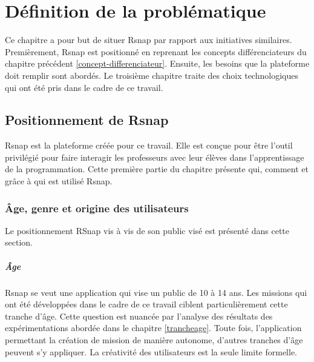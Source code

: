 \chapter{Définition de la problématique}
Ce chapitre a pour but de situer Rsnap par rapport aux initiatives similaires. Premièrement, Rsnap est positionné en reprenant les concepts différenciateurs du chapitre précédent \ref{concept-differenciateur}. Ensuite, les besoins que la plateforme doit remplir sont abordés. Le troisième chapitre traite des choix technologiques qui ont été pris dans le cadre de ce travail.

\section{Positionnement de Rsnap}
Rsnap est la plateforme créée pour ce travail. Elle est conçue pour être l'outil privilégié pour faire interagir les professeurs avec leur élèves dans l'apprentissage de la programmation.
Cette première partie du chapitre présente qui, comment et grâce à qui est utilisé Rsnap.

% 

\subsection{Âge, genre et origine des utilisateurs}
Le positionnement RSnap vis à vis de son public visé est présenté dans cette section.

\paragraph{Âge}
Rsnap se veut une application qui vise un public de 10 à 14 ans. Les missions qui ont été développées dans le cadre de ce travail ciblent particulièrement cette tranche d'âge. Cette question est nuancée par l'analyse des résultats des expérimentations abordée dans le chapitre \ref{trancheage}. %
Toute fois, l'application permettant la création de mission de manière autonome, d'autres tranches d'âge peuvent s'y appliquer. La créativité des utilisateurs est la seule limite formelle.


